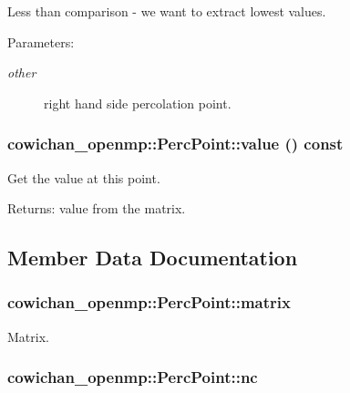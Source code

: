 Less than comparison - we want to extract lowest values. \begin{Desc}
\item[Parameters:]
\begin{description}
\item[{\em other}]right hand side percolation point. \end{description}
\end{Desc}
\hypertarget{classcowichan__openmp_1_1_perc_point_f6359d4fe7c6f64fc80a4ac14327f0a4}{
\subsubsection[{value}]{ cowichan\_\-openmp::PercPoint::value () const}}
\label{classcowichan__openmp_1_1_perc_point_f6359d4fe7c6f64fc80a4ac14327f0a4}


Get the value at this point. \begin{Desc}
\item[Returns:]value from the matrix. \end{Desc}


\subsection{Member Data Documentation}
\hypertarget{classcowichan__openmp_1_1_perc_point_73e69a16d466989c650d4a4f00725ac0}{
\subsubsection[{matrix}]{ {\bf cowichan\_\-openmp::PercPoint::matrix}}}
\label{classcowichan__openmp_1_1_perc_point_73e69a16d466989c650d4a4f00725ac0}


Matrix. \hypertarget{classcowichan__openmp_1_1_perc_point_89fe3a98f39c289fd289998430a4cba3}{
\subsubsection[{nc}]{ {\bf cowichan\_\-openmp::PercPoint::nc}}}
\label{classcowichan__openmp_1_1_perc_point_89fe3a98f39c289fd289998430a4cba3}


